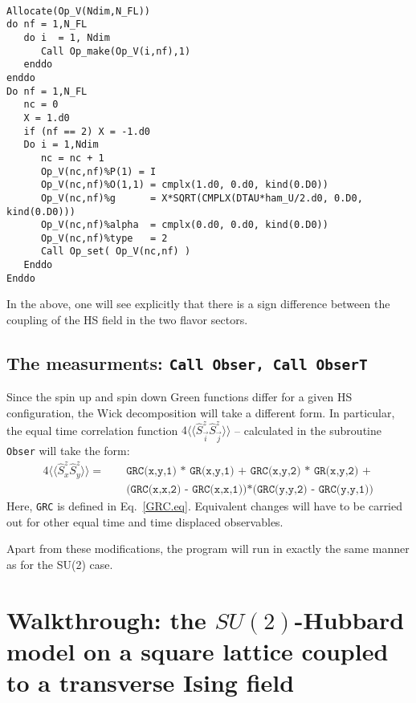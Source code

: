 \begin{lstlisting}

Allocate(Op_V(Ndim,N_FL))
do nf = 1,N_FL
   do i  = 1, Ndim
      Call Op_make(Op_V(i,nf),1)
   enddo
enddo
Do nf = 1,N_FL
   nc = 0
   X = 1.d0
   if (nf == 2) X = -1.d0
   Do i = 1,Ndim
      nc = nc + 1
      Op_V(nc,nf)%P(1) = I
      Op_V(nc,nf)%O(1,1) = cmplx(1.d0, 0.d0, kind(0.D0))
      Op_V(nc,nf)%g      = X*SQRT(CMPLX(DTAU*ham_U/2.d0, 0.D0, kind(0.D0))) 
      Op_V(nc,nf)%alpha  = cmplx(0.d0, 0.d0, kind(0.D0))
      Op_V(nc,nf)%type   = 2
      Call Op_set( Op_V(nc,nf) )
   Enddo
Enddo

\end{lstlisting}
In the above, one will see explicitly that  there is a sign   difference between  the coupling of the HS field  in  the  two flavor sectors.  

 \subsection{The  measurments: \texttt{Call Obser, Call  ObserT} } 
 Since  the spin up and spin down Green functions differ  for a given HS configuration,  the Wick decomposition will take a different form. In particular,  the equal time correlation function
 $ 4 \langle \langle \hat{S}^{z}_{\vec{i}}   \hat{S}^{z}_{\vec{j}} \rangle \rangle   $  -- calculated in the subroutine  \texttt{Obser}  will take the form: 
  \begin{eqnarray}
   4 \langle \langle \hat{S}^{z}_{x}   \hat{S}^{z}_{y} \rangle \rangle   =  & &  \texttt{  GRC(x,y,1) * GR(x,y,1) + GRC(x,y,2) * GR(x,y,2) + }  \nonumber \\ 
& & \texttt{   (GRC(x,x,2) - GRC(x,x,1))*(GRC(y,y,2) - GRC(y,y,1))}  \nonumber
  \end{eqnarray}
  Here,  \texttt{GRC}  is defined in Eq.~\ref{GRC.eq}.  Equivalent changes will have to be carried out for other equal time and time displaced observables. 
  
  Apart from these modifications, the program  will run in exactly the same manner as for the SU(2) case. 
 
\section{Walkthrough: the $SU(2)$-Hubbard model on a square lattice coupled to a transverse Ising field}\label{sec:walk2}


